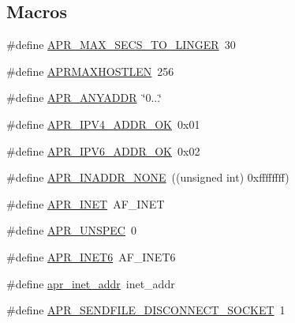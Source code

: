 \subsection*{Macros}
\begin{DoxyCompactItemize}
\item 
\#define \hyperlink{group__apr__network__io_ga8311c84f6946742188a6b9a45e92ea8e}{A\-P\-R\-\_\-\-M\-A\-X\-\_\-\-S\-E\-C\-S\-\_\-\-T\-O\-\_\-\-L\-I\-N\-G\-E\-R}~30
\item 
\#define \hyperlink{group__apr__network__io_ga7f5b3882209106bb407b1d518d6ad59d}{A\-P\-R\-M\-A\-X\-H\-O\-S\-T\-L\-E\-N}~256
\item 
\#define \hyperlink{group__apr__network__io_gadce1131c46b897ec63e9e4316a4631dd}{A\-P\-R\-\_\-\-A\-N\-Y\-A\-D\-D\-R}~\char`\"{}0...\char`\"{}
\item 
\#define \hyperlink{group__apr__network__io_ga58aa30a94127b4a80f27fbf2e03fdfd8}{A\-P\-R\-\_\-\-I\-P\-V4\-\_\-\-A\-D\-D\-R\-\_\-\-O\-K}~0x01
\item 
\#define \hyperlink{group__apr__network__io_gaef1f70f9b969d25832a230f429837207}{A\-P\-R\-\_\-\-I\-P\-V6\-\_\-\-A\-D\-D\-R\-\_\-\-O\-K}~0x02
\item 
\#define \hyperlink{group__apr__network__io_ga16eb7ee55ff87a5093f2114ea5351217}{A\-P\-R\-\_\-\-I\-N\-A\-D\-D\-R\-\_\-\-N\-O\-N\-E}~((unsigned int) 0xffffffff)
\item 
\#define \hyperlink{group__apr__network__io_gaa96e8e8dbf92bc77643a4032017b3d67}{A\-P\-R\-\_\-\-I\-N\-E\-T}~A\-F\-\_\-\-I\-N\-E\-T
\item 
\#define \hyperlink{group__apr__network__io_gaa7a33b17a7d0820b09ef489bd3328f85}{A\-P\-R\-\_\-\-U\-N\-S\-P\-E\-C}~0
\item 
\#define \hyperlink{group__apr__network__io_gad09d9ea8995f50f35073ae0c77efb44f}{A\-P\-R\-\_\-\-I\-N\-E\-T6}~A\-F\-\_\-\-I\-N\-E\-T6
\item 
\#define \hyperlink{group__apr__network__io_ga46a8b06887871cfd60a3e37385775e22}{apr\-\_\-inet\-\_\-addr}~inet\-\_\-addr
\item 
\#define \hyperlink{group__apr__network__io_gaca378d0e24b1588e3fdb143e4ea9090d}{A\-P\-R\-\_\-\-S\-E\-N\-D\-F\-I\-L\-E\-\_\-\-D\-I\-S\-C\-O\-N\-N\-E\-C\-T\-\_\-\-S\-O\-C\-K\-E\-T}~1
\end{DoxyCompactItemize}

